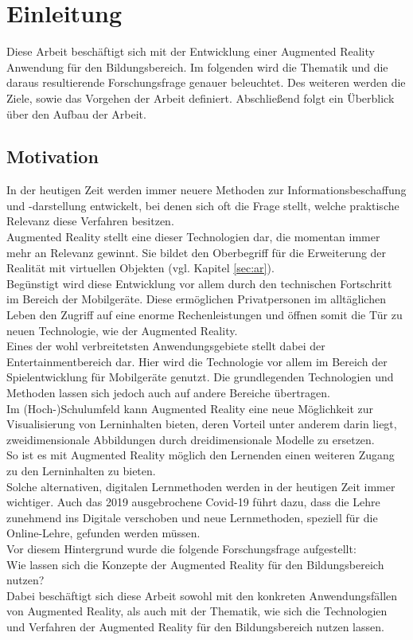 \chapter{Einleitung}\label{chapter:einleitung}
Diese Arbeit beschäftigt sich mit der Entwicklung einer Augmented Reality Anwendung für den Bildungsbereich. Im folgenden wird die Thematik und die daraus resultierende Forschungsfrage genauer beleuchtet. Des weiteren werden die Ziele, sowie das Vorgehen der Arbeit definiert. Abschließend folgt ein Überblick über den Aufbau der Arbeit.

\section{Motivation}\label{sec:motivation}
In der heutigen Zeit werden immer neuere Methoden zur Informationsbeschaffung und -darstellung entwickelt, bei denen sich oft die Frage stellt, welche praktische Relevanz diese Verfahren besitzen. \\
Augmented Reality stellt eine dieser Technologien dar, die momentan immer mehr an Relevanz gewinnt. Sie bildet den Oberbegriff für die Erweiterung der Realität mit virtuellen Objekten (vgl. Kapitel \ref{sec:ar}). \\
Begünstigt wird diese Entwicklung vor allem durch den technischen Fortschritt im Bereich der Mobilgeräte. Diese ermöglichen Privatpersonen im alltäglichen Leben den Zugriff auf eine enorme Rechenleistungen und öffnen somit die Tür zu neuen Technologie, wie der Augmented Reality. \\
Eines der wohl verbreitetsten Anwendungsgebiete stellt dabei der Entertainmentbereich dar. Hier wird die Technologie vor allem im Bereich der Spielentwicklung für Mobilgeräte genutzt. Die grundlegenden Technologien und Methoden lassen sich jedoch auch auf andere Bereiche übertragen. \\
Im (Hoch-)Schulumfeld kann Augmented Reality eine neue Möglichkeit zur Visualisierung von Lerninhalten bieten, deren Vorteil unter anderem darin liegt, zweidimensionale Abbildungen durch dreidimensionale Modelle zu ersetzen. \\
So ist es mit Augmented Reality möglich den Lernenden einen weiteren Zugang zu den Lerninhalten zu bieten. \\
Solche alternativen, digitalen Lernmethoden werden in der heutigen Zeit immer wichtiger. Auch das 2019 ausgebrochene Covid-19 führt dazu, dass die Lehre zunehmend ins Digitale verschoben und neue Lernmethoden, speziell für die Online-Lehre, gefunden werden müssen. \\
Vor diesem Hintergrund wurde die folgende Forschungsfrage aufgestellt:\\
\glqq Wie lassen sich die Konzepte der Augmented Reality für den Bildungsbereich nutzen?\grqq \\
Dabei beschäftigt sich diese Arbeit sowohl mit den konkreten Anwendungsfällen von Augmented Reality, als auch mit der Thematik, wie sich die Technologien und Verfahren der Augmented Reality für den Bildungsbereich nutzen lassen. \\



